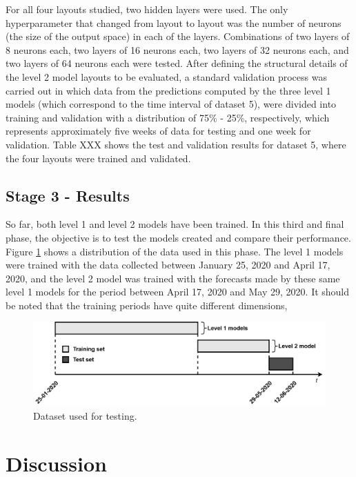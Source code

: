 For all four layouts studied, two hidden layers were used. The only hyperparameter that changed from layout to layout was the number of neurons (the size of the output space) in each of the layers. Combinations of two layers of 8 neurons each, two layers of 16 neurons each, two layers of 32 neurons each, and two layers of 64 neurons each were tested. After defining the structural details of the level 2 model layouts to be evaluated, a standard validation process was carried out in which data from the predictions computed by the three level 1 models (which correspond to the time interval of dataset 5), were divided into training and validation with a distribution of 75\% - 25\%, respectively, which represents approximately five weeks of data for testing and one week for validation. Table XXX shows the test and validation results for dataset 5, where the four layouts were trained and validated.









\subsection{Stage 3 - Results}

So far, both level 1 and level 2 models have been trained. In this third and final phase, the objective is to test the models created and compare their performance. Figure \ref{test} shows a distribution of the data used in this phase. The level 1 models were trained with the data collected between January 25, 2020 and April 17, 2020, and the level 2 model was trained with the forecasts made by these same level 1 models for the period between April 17, 2020 and May 29, 2020. It should be noted that the training periods have quite different dimensions,

\begin{figure}[h!]
    \centering
    \begin{center}
    \includegraphics[width=1\textwidth]{Images/Test.png}
    \caption{Dataset used for testing.}
    \label{test}
    \end{center}
\end{figure}

\section{Discussion}


